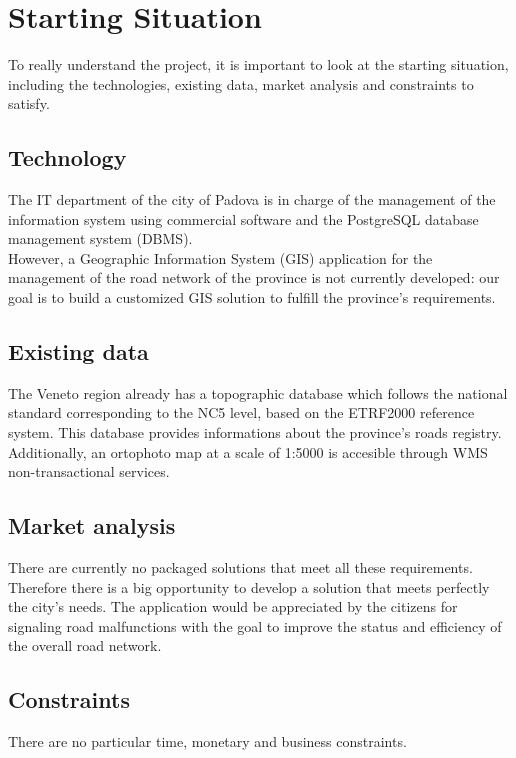 \section{Starting Situation}
To really understand the project, it is important to look at the starting situation, including the technologies, existing data, market analysis and constraints to satisfy.
\subsection{Technology}
The IT department of the city of Padova is in charge of the management of the information system using commercial software and the PostgreSQL database management system (DBMS).\\
However, a Geographic Information System (GIS) application for the management of the road network of the province is not currently developed: our goal is to build a customized GIS solution to fulfill the province’s requirements.
\subsection{Existing data}
The Veneto region already has a topographic database which follows the national standard corresponding to the NC5 level, based on the ETRF2000 reference system. This database provides informations about the province's roads registry.\\
Additionally, an ortophoto map at a scale of 1:5000 is accesible through WMS non-transactional services.
\subsection{Market analysis}
There are currently no packaged solutions that meet all these requirements. Therefore there is a big opportunity to develop a solution that meets perfectly the city's needs. 
The application would be appreciated by the citizens for  signaling road malfunctions with the goal to improve the status and efficiency of the overall road network.
\subsection{Constraints}
There are no particular time, monetary and business constraints.